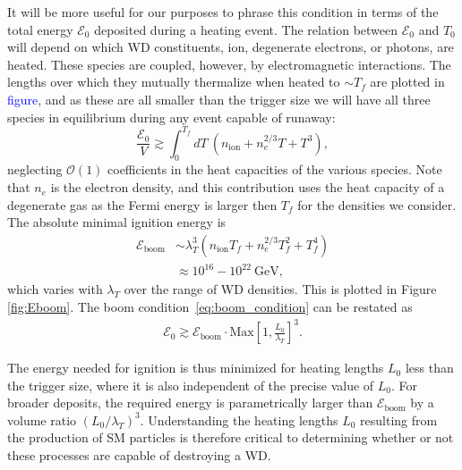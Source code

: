 \documentclass[twocolumn,preprintnumbers,amsmath,amssymb,prl, superscriptaddress]{revtex4}
\newcommand{\Ez}{\mathcal{E}_0}
\newcommand{\Eboom}{\mathcal{E}_\text{boom}}
\newcommand{\OO}{\mathcal{O}}
\newcommand{\GeV}{\text{GeV}}
\begin{document}
It will be more useful for our purposes to phrase this condition in terms of the total energy $\Ez$ deposited during a heating event.
The relation between $\Ez$ and $T_0$ will depend on which WD constituents, ion, degenerate electrons, or photons, are heated.
These species are coupled, however, by electromagnetic interactions.
The lengths over which they mutually thermalize when heated to $\sim T_f$ are plotted in \textcolor{blue}{figure}, and as these are all smaller than the trigger size we will have all three species in equilibrium during any event capable of runaway:
\begin{equation}
\label{eq:boom}
  \frac{\Ez}{V} \gtrsim \int_0^{T_f} dT ~(n_\text{ion} + n_e^{2/3} T + T^3),
\end{equation}
neglecting $\OO(1)$ coefficients in the heat capacities of the various species.
Note that $n_e$ is the electron density, and this contribution uses the heat capacity of a degenerate gas as the Fermi energy is larger then $T_f$ for the densities we consider.
The absolute minimal ignition energy is
\begin{align}
\label{eq:Eboom}
\Eboom &\sim \lambda_T^3 (n_\text{ion} T_f + n_e^{2/3} T_f^2 + T_f^4) \\
         &\approx 10^{16} - 10^{22} ~\GeV \nonumber,
\end{align}
which varies with $\lambda_T$ over the range of WD densities.
This is plotted in Figure \ref{fig:Eboom}.
The boom condition~\eqref{eq:boom_condition} can be restated as
\begin{align}
    \Ez \gtrsim
    \Eboom \cdot \text{Max}\left[1, \frac{L_0}{\lambda_T}\right]^3.
\end{align}

The energy needed for ignition is thus minimized for heating lengths $L_0$ less than the trigger size, where it is also independent of the precise value of $L_0$.
For broader deposits, the required energy is parametrically larger than $\Eboom$ by a volume ratio $(L_0/\lambda_T)^3$.
Understanding the heating lengths $L_0$ resulting from the production of SM particles is therefore critical to determining whether or not these processes are capable of destroying a WD.
\end{document}
